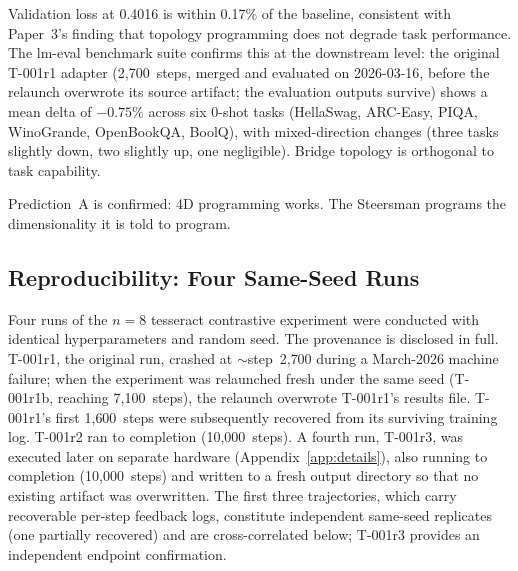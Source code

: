 Validation loss at 0.4016 is within 0.17\% of the baseline,
consistent with Paper~3's finding that topology programming does not
degrade task performance. The lm-eval benchmark suite confirms this
at the downstream level: the original T-001r1 adapter (2{,}700~steps,
merged and evaluated on 2026-03-16, before the relaunch overwrote its
source artifact; the evaluation outputs survive) shows a mean delta of
$-0.75\%$ across six 0-shot tasks
(HellaSwag, ARC-Easy, PIQA, WinoGrande, OpenBookQA, BoolQ), with
mixed-direction changes (three tasks slightly down, two slightly up,
one negligible). Bridge topology is orthogonal to task capability.

Prediction~A is confirmed: 4D programming works. The Steersman
programs the dimensionality it is told to program.

\subsection{Reproducibility: Four Same-Seed Runs}
\label{sec:reproducibility}

Four runs of the $n = 8$ tesseract contrastive experiment were
conducted with identical hyperparameters and random seed. The
provenance is disclosed in full. T-001r1, the original run, crashed
at ${\sim}$step~2{,}700 during a March-2026 machine failure; when the
experiment was relaunched fresh under the same seed (T-001r1b,
reaching 7{,}100~steps), the relaunch overwrote T-001r1's results
file. T-001r1's first 1{,}600~steps were subsequently recovered from
its surviving training log. T-001r2 ran to completion
(10{,}000~steps). A fourth run, T-001r3, was executed later on
separate hardware (Appendix~\ref{app:details}), also running to
completion (10{,}000~steps) and written to a fresh output directory so
that no existing artifact was overwritten. The first three
trajectories, which carry recoverable per-step feedback logs,
constitute independent same-seed replicates (one partially recovered)
and are cross-correlated below; T-001r3 provides an independent
endpoint confirmation.

